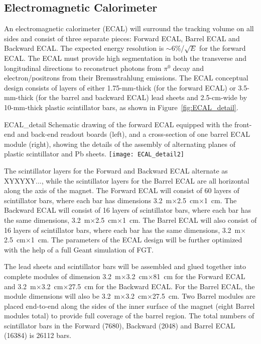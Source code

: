\subsection{Electromagnetic Calorimeter}
\label{cdrsec:detectors-nd-ref-fgt-ecal}

An electromagnetic calorimeter (ECAL) will surround the tracking
volume on all sides and consist of three separate pieces: Forward
ECAL, Barrel ECAL and Backward ECAL.  The expected energy resolution
is $\sim 6$\%/$\sqrt{E}$ for the forward ECAL.  The ECAL must provide
high segmentation in both the transverse and longitudinal directions
to reconstruct photons from $\pi^0$ decay and electron/positrons from
their Bremsstrahlung emissions.  The ECAL conceptual design consists
of layers of either 1.75-mm-thick (for the forward ECAL) or
3.5-mm-thick (for the barrel and backward ECAL) lead sheets and
2.5-cm-wide by 10-mm-thick plastic scintillator bars, as shown in
Figure~\ref{fig:ECAL_detail}.
\begin{cdrfigure}{ECAL_detail}
{Schematic drawing of the forward ECAL equipped with the front-end and back-end readout boards (left), 
and a cross-section of one barrel ECAL module (right), showing the details of the assembly of alternating planes
of plastic scintillator and Pb sheets.}
\texttt{[image: ECAL\_detail2]}
\end{cdrfigure}
The scintillator layers for the Forward and Backward ECAL alternate as
XYXYXY..., while the scintillator layers for the Barrel ECAL are all
horizontal along the axis of the magnet.  The Forward ECAL will
consist of 60 layers of scintillator bars, where each bar has
dimensions 3.2~m$\times$2.5~cm$\times$1~cm. The Backward ECAL will
consist of 16 layers of scintillator bars, where each bar has the same
dimensions, 3.2~m$\times$2.5~cm$\times$1~cm. The Barrel ECAL will also
consist of 16 layers of scintillator bars, where each bar has the same
dimensions, 3.2~m$\times$2.5~cm$\times$1~cm. The parameters of the
ECAL design will be further optimized with the help of a full Geant
simulation of FGT.

The lead sheets and scintillator bars will be assembled and glued
together into complete modules of dimension
3.2~m$\times$3.2~cm$\times$81~cm for the Forward ECAL and
3.2~m$\times$3.2~cm$\times$27.5~cm for the Backward ECAL. For the
Barrel ECAL, the module dimensions will also be
3.2~m$\times$3.2~cm$\times$27.5~cm. Two Barrel modules are placed
end-to-end along the sides of the inner surface of the magnet (eight
Barrel modules total) to provide full coverage of the barrel region.
The total numbers of scintillator bars in the Forward (7680), Backward
(2048) and Barrel ECAL (16384) is 26112 bars.

